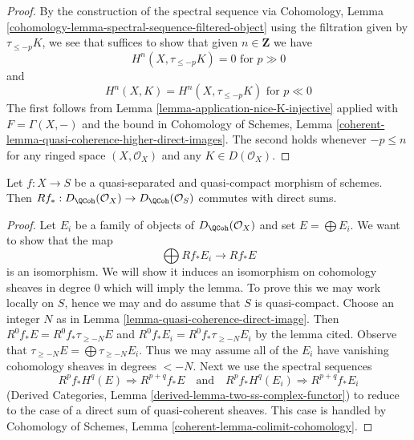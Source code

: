 \begin{proof}
By the construction of the spectral sequence via
Cohomology, Lemma \ref{cohomology-lemma-spectral-sequence-filtered-object}
using the filtration given by $\tau_{\leq -p}K$, we see that
suffices to show that given $n \in \mathbf{Z}$ we have
$$
H^n(X, \tau_{\leq -p}K) = 0 \text{ for } p \gg 0
$$
and
$$
H^n(X, K) = H^n(X, \tau_{\leq -p}K) \text{ for } p \ll 0
$$
The first follows from Lemma \ref{lemma-application-nice-K-injective}
applied with $F = \Gamma(X, -)$ and the bound in
Cohomology of Schemes, Lemma
\ref{coherent-lemma-quasi-coherence-higher-direct-images}.
The second holds whenever
$-p \leq n$ for any ringed space $(X, \mathcal{O}_X)$ and any
$K \in D(\mathcal{O}_X)$.
\end{proof}

\begin{lemma}
\label{lemma-quasi-coherence-pushforward-direct-sums}
Let $f : X \to S$ be a quasi-separated and quasi-compact morphism of
schemes. Then
$Rf_* : D_\QCoh(\mathcal{O}_X) \to D_\QCoh(\mathcal{O}_S)$
commutes with direct sums.
\end{lemma}

\begin{proof}
Let $E_i$ be a family of objects of $D_\QCoh(\mathcal{O}_X)$
and set $E = \bigoplus E_i$. We want to show that the map
$$
\bigoplus Rf_*E_i \longrightarrow Rf_*E
$$
is an isomorphism. We will show it induces an isomorphism on
cohomology sheaves in degree $0$ which will imply the lemma.
To prove this we may work locally on $S$, hence we may and do
assume that $S$ is quasi-compact.
Choose an integer $N$ as in Lemma \ref{lemma-quasi-coherence-direct-image}.
Then $R^0f_*E = R^0f_*\tau_{\geq -N}E$ and
$R^0f_*E_i = R^0f_*\tau_{\geq -N}E_i$ by the lemma cited. Observe that
$\tau_{\geq -N}E = \bigoplus \tau_{\geq -N}E_i$.
Thus we may assume all of the $E_i$ have vanishing cohomology
sheaves in degrees $< -N$. Next we use the spectral sequences
$$
R^pf_*H^q(E) \Rightarrow R^{p + q}f_*E
\quad\text{and}\quad
R^pf_*H^q(E_i) \Rightarrow R^{p + q}f_*E_i
$$
(Derived Categories, Lemma \ref{derived-lemma-two-ss-complex-functor})
to reduce to the case of a direct sum of quasi-coherent sheaves.
This case is handled by
Cohomology of Schemes, Lemma \ref{coherent-lemma-colimit-cohomology}.
\end{proof}









